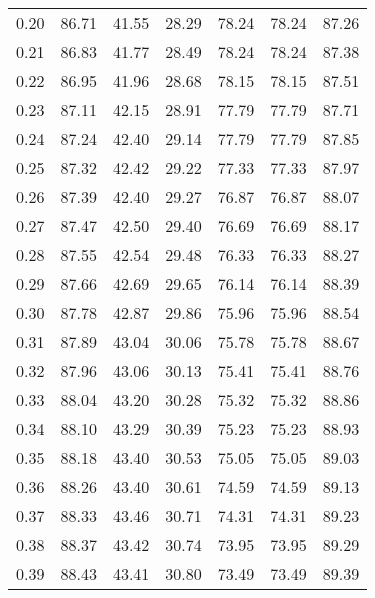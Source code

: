 \begin{tabular}{|c|c|c|c|c|c|c|}
      0.20 &     86.71 &     41.55 &      28.29 &   78.24 &      78.24 &         87.26 \\
      0.21 &     86.83 &     41.77 &      28.49 &   78.24 &      78.24 &         87.38 \\
      0.22 &     86.95 &     41.96 &      28.68 &   78.15 &      78.15 &         87.51 \\
      0.23 &     87.11 &     42.15 &      28.91 &   77.79 &      77.79 &         87.71 \\
      0.24 &     87.24 &     42.40 &      29.14 &   77.79 &      77.79 &         87.85 \\
      0.25 &     87.32 &     42.42 &      29.22 &   77.33 &      77.33 &         87.97 \\
      0.26 &     87.39 &     42.40 &      29.27 &   76.87 &      76.87 &         88.07 \\
      0.27 &     87.47 &     42.50 &      29.40 &   76.69 &      76.69 &         88.17 \\
      0.28 &     87.55 &     42.54 &      29.48 &   76.33 &      76.33 &         88.27 \\
      0.29 &     87.66 &     42.69 &      29.65 &   76.14 &      76.14 &         88.39 \\
      0.30 &     87.78 &     42.87 &      29.86 &   75.96 &      75.96 &         88.54 \\
      0.31 &     87.89 &     43.04 &      30.06 &   75.78 &      75.78 &         88.67 \\
      0.32 &     87.96 &     43.06 &      30.13 &   75.41 &      75.41 &         88.76 \\
      0.33 &     88.04 &     43.20 &      30.28 &   75.32 &      75.32 &         88.86 \\
      0.34 &     88.10 &     43.29 &      30.39 &   75.23 &      75.23 &         88.93 \\
      0.35 &     88.18 &     43.40 &      30.53 &   75.05 &      75.05 &         89.03 \\
      0.36 &     88.26 &     43.40 &      30.61 &   74.59 &      74.59 &         89.13 \\
      0.37 &     88.33 &     43.46 &      30.71 &   74.31 &      74.31 &         89.23 \\
      0.38 &     88.37 &     43.42 &      30.74 &   73.95 &      73.95 &         89.29 \\
      0.39 &     88.43 &     43.41 &      30.80 &   73.49 &      73.49 &         89.39 \\

\end{tabular}
